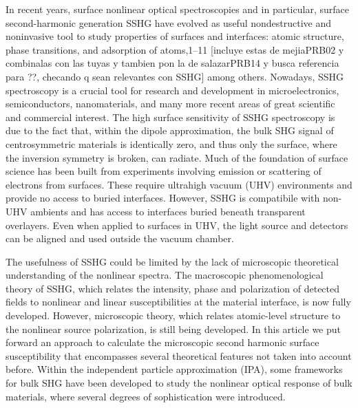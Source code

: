 \documentclass[floatfix,prb,aps,superscriptaddress,11pt,preprint,letterpaper]{revtex4}
\def\chonn{red}
\begin{document}
In recent years, surface nonlinear optical spectroscopies and in 
particular, surface second-harmonic generation SSHG have evolved as useful 
nondestructive and noninvasive tool to study properties of surfaces 
and interfaces: atomic structure, phase transitions, and adsorption of 
atoms,1–11{\color{\chonn} [incluye estas de mejiaPRB02 y combinalas con
  las tuyas y tambien pon la de salazarPRB14 y busca referencia para
  ??, checando q sean relevantes con SSHG]} 
among others. \cite{hughesPRB96, 
     guyot-sionnestPRB88, 
     lupkeSSR99, 
     downerPSSA01, 
     shenAPB99, 
     shenNAT89, 
     chenPRL81, 
    mendozaPRL98,downerSIA01,cazzanelliNM14}
Nowadays, SSHG spectroscopy is a crucial tool for research and development
in microelectronics,\cite{??} semiconductors,\cite{??} nanomaterials,\cite{??} and many more recent 
areas of great scientific and commercial interest.\cite{??}
The high surface sensitivity of SSHG spectroscopy is due to the
fact that, within the dipole approximation, the bulk SHG signal of
centrosymmetric materials is identically zero, and thus only the
surface, where the inversion symmetry is broken, can radiate. 
Much of the foundation of surface science has been built from
experiments involving emission or scattering of electrons from
surfaces. These require ultrahigh vacuum (UHV) environments and
provide no access to buried interfaces. 
However, SSHG
is compatibile with non-UHV ambients and has access to
interfaces buried beneath transparent overlayers. Even when applied to
surfaces in UHV, the light source and detectors can be aligned and
used outside the vacuum chamber. 

The usefulness of SSHG could be limited by
the lack of microscopic theoretical
understanding of the nonlinear spectra. The macroscopic
phenomenological theory of SSHG, which relates the intensity,
phase and polarization of detected fields to nonlinear and linear
susceptibilities at the material interface, is now fully developed. 
However, microscopic theory, which relates atomic-level structure to
the nonlinear source polarization, is still being developed.
In this article we put forward an approach to calculate the
microscopic second harmonic surface susceptibility that encompasses several
theoretical features not taken into account before. 
Within the independent particle approximation (IPA),  
some frameworks for bulk SHG have been developed to study the 
nonlinear optical response of bulk materials, where several degrees of
sophistication were 
introduced.\cite{butcherPOPS63,aspnesPRB72,sipePRB93,levinePRB94,aversaPRB95,hughesPRB96,rashkeevPRB98} 
\end{document}
